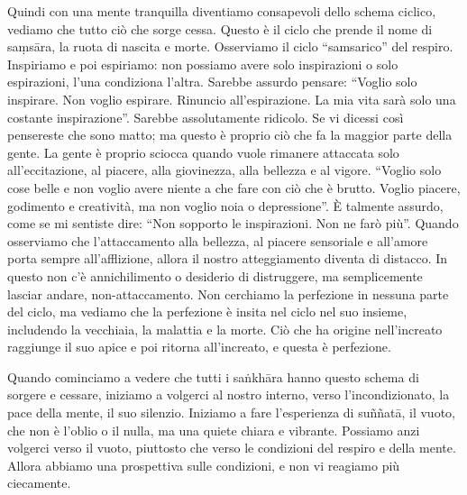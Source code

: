 Quindi con una mente tranquilla diventiamo consapevoli dello schema
ciclico, vediamo che tutto ciò che sorge cessa. Questo è il ciclo che
prende il nome di saṃsāra, la ruota di nascita e morte. Osserviamo il
ciclo ``samsarico'' del respiro. Inspiriamo e poi espiriamo: non
possiamo avere solo inspirazioni o solo espirazioni, l'una condiziona
l'altra. Sarebbe assurdo pensare: ``Voglio solo inspirare. Non voglio
espirare. Rinuncio all'espirazione. La mia vita sarà solo una costante
inspirazione''. Sarebbe assolutamente ridicolo. Se vi dicessi così
pensereste che sono matto; ma questo è proprio ciò che fa la maggior
parte della gente. La gente è proprio sciocca quando vuole rimanere
attaccata solo all'eccitazione, al piacere, alla giovinezza, alla
bellezza e al vigore. ``Voglio solo cose belle e non voglio avere niente
a che fare con ciò che è brutto. Voglio piacere, godimento e creatività,
ma non voglio noia o depressione''. È talmente assurdo, come se mi
sentiste dire: ``Non sopporto le inspirazioni. Non ne farò più''. Quando
osserviamo che l'attaccamento alla bellezza, al piacere sensoriale e
all'amore porta sempre all'afflizione, allora il nostro atteggiamento
diventa di distacco. In questo non c'è annichilimento o desiderio di
distruggere, ma semplicemente lasciar andare, non-attaccamento. Non
cerchiamo la perfezione in nessuna parte del ciclo, ma vediamo che la
perfezione è insita nel ciclo nel suo insieme, includendo la vecchiaia,
la malattia e la morte. Ciò che ha origine nell'increato raggiunge il
suo apice e poi ritorna all'increato, e questa è perfezione.

Quando cominciamo a vedere che tutti i saṅkhāra hanno questo schema di
sorgere e cessare, iniziamo a volgerci al nostro interno, verso
l'incondizionato, la pace della mente, il suo silenzio. Iniziamo a fare
l'esperienza di suññatā, il vuoto, che non è l'oblio o il nulla, ma una
quiete chiara e vibrante. Possiamo anzi volgerci verso il vuoto,
piuttosto che verso le condizioni del respiro e della mente. Allora
abbiamo una prospettiva sulle condizioni, e non vi reagiamo più
ciecamente.

